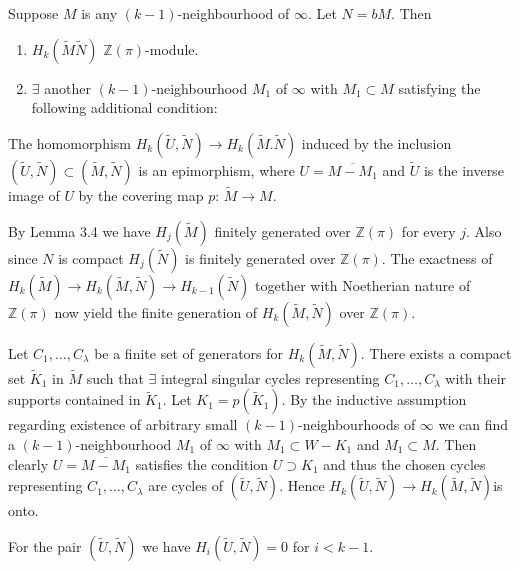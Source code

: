  \begin{lemma}\label{chap2:lem3.6}%
Suppose $M$ is any $(k-1)$-neighbourhood of $\infty$. Let $N = bM$. Then
\begin{enumerate}[(1)]
\item $H_k (\tilde {M}\tilde {N})$  $\mathbb{Z} (\pi)$-module. 

\item $\exists$ another $(k-1)$-neighbourhood $M_1$ of $\infty$ with
  $M_1 \subset M$ satisfying the following additional condition: 
\end{enumerate}

The homomorphism $H_k (\tilde{U}, \tilde{N}) \to H_k (\tilde
{M}. \tilde {N})$ induced by the inclusion $(\tilde{U}, \tilde {N})
\subset (\tilde {M}, \tilde{N})$ is an epimorphism, where $U =
\overline{M - M_1}$ and $\tilde{U}$ is the inverse image of $U$ by the
covering map $p$: $\tilde M \to M$. 
 \end{lemma} 

\medskip
{}
By Lemma 3.4 we have $H_j (\tilde{M})$ finitely generated over
$\mathbb{Z}(\pi)$ for every $j$. Also since $N$ is compact $H_j
(\tilde{N})$ is finitely generated over $\mathbb{Z} (\pi)$. The
exactness of $H_k (\tilde {M})\to H_k (\tilde{M},\tilde{N})\to
H_{k-1}(\tilde{N})$ together with Noetherian nature of
$\mathbb{Z}(\pi)$ now yield the finite generation of $H_k (\tilde{M},
\tilde{N})$ over $\mathbb{Z}(\pi)$. 


\medskip
{}
Let $C_1, \ldots, C_\lambda$ be a finite set of generators for $H_k
(\tilde{M}, \tilde{N})$. There exists a compact set $\tilde{K}_1$ in $
\tilde{M}$ such that $\exists$ integral singular cycles representing
$C_1, \ldots, C_\lambda$ with their supports contained in
$\tilde{K}_1$. Let $K_1 = p(\tilde{K}_{1})$. By the inductive
assumption regarding existence of arbitrary small
$(k-1)$-neighbourhoods of $\infty$ we can find a $(k-1)$-neighbourhood
$M_1$ of $ \infty$ with $M_1 \subset W-K_1$ and $M_1 \subset M$. Then
clearly $ U = \overline{M-M_1}$ satisfies the condition $U \supset
K_1$  and thus the chosen cycles representing $C_1, \ldots,
C_{\lambda}$ are cycles of $(\tilde{U} ,\tilde{N})$. Hence
$H_k(\tilde{U}, \tilde{N}) \to H_k(\tilde{M},
\tilde{N})$\pageoriginale is onto.  

\begin{alphremark}\label{chap2:alphremA}%
For the pair $(\tilde{U}, \tilde{N})$ we have $H_i 
(\tilde{U}, \tilde{N}) = 0$ for $i < k - 1$.  
 \end{alphremark} 


